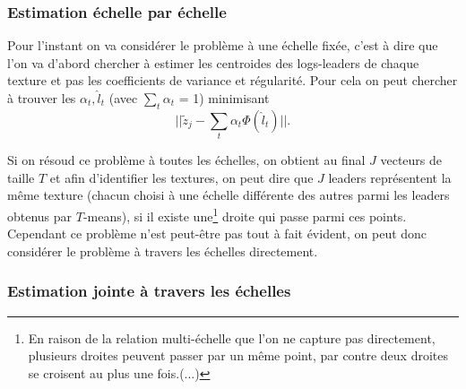 \documentclass[11pt]{article} %
\begin{document}
\subsubsection{Estimation échelle par échelle}
Pour l'instant on va considérer le problème à une échelle fixée, c'est à dire que l'on va d'abord chercher à estimer les centroides des logs-leaders de chaque texture et pas les coefficients de variance et régularité. Pour cela on peut chercher à trouver les $\alpha_t, \hat{l}_t$ (avec $\sum_t \alpha_t$ = 1) minimisant
\begin{equation}
	||\tilde z_j - \sum_t \alpha_t \Phi(\hat{l}_t)||.
\end{equation}
\par
Si on résoud ce problème à toutes les échelles, on obtient au final $J$ vecteurs de taille $T$ et afin d'identifier les textures, on peut dire que $J$ leaders représentent la même texture (chacun choisi à une échelle différente des autres parmi les leaders obtenus par $T$-means), si il existe une\footnote{En raison de la relation multi-échelle que l'on ne capture pas directement, plusieurs droites peuvent passer par un même point, par contre deux droites se croisent au plus une fois.(...)} droite qui passe parmi ces points. Cependant ce problème n'est peut-être pas tout à fait évident, on peut donc considérer le problème à travers les échelles directement.
\subsubsection{Estimation jointe à travers les échelles}
\end{document}
